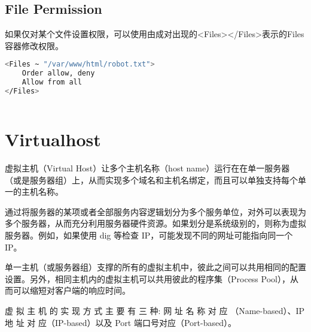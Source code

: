 \begin{lstlisting}[language=bash]

\end{lstlisting}



\begin{lstlisting}[language=bash]

\end{lstlisting}




\subsection{File Permission}

如果仅对某个文件设置权限，可以使用由成对出现的<Files></Files>表示的Files容器修改权限。


\begin{lstlisting}[language=bash]
<Files ~ "/var/www/html/robot.txt">
	Order allow, deny
	Allow from all
</Files>
\end{lstlisting}



\begin{lstlisting}[language=bash]

\end{lstlisting}

\section{Virtualhost}



虚拟主机（Virtual Host）让多个主机名称（host name）运行在在单一服务器（或是服务器组）上，从而实现多个域名和主机名绑定，而且可以单独支持每个单一的主机名称。

通过将服务器的某项或者全部服务内容逻辑划分为多个服务单位，对外可以表现为多个服务器，从而充分利用服务器硬件资源。如果划分是系统级别的，则称为虚拟服务器。例如，如果使用 dig 等检查 IP，可能发现不同的网址可能指向同一个 IP。

单一主机（或服务器组）支撑的所有的虚拟主机中，彼此之间可以共用相同的配置设置。另外，相同主机内的虚拟主机可以共用彼此的程序集（Process Pool），从而可以缩短对客户端的响应时间。

虚 拟 主 机 的 实 现 方 式 主 要 有 三 种: 网 址 名 称 对 应 （Name-based）、IP 地 址 对 应（IP-based）以及 Port 端口号对应（Port-based）。

